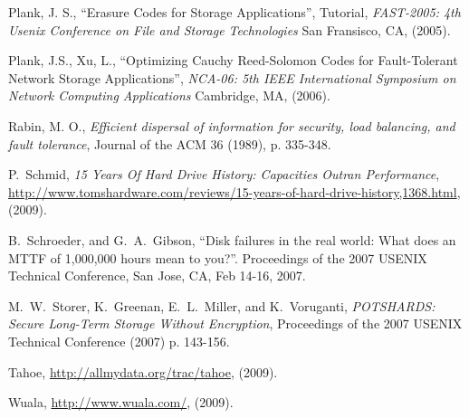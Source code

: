 \documentclass[XXX,endnotes]{usetex-v1}
\begin{document}
\begin{thebibliography}{99}
 Plank, J. S., ``Erasure Codes for Storage Applications'', Tutorial, 
\emph{FAST-2005: 4th Usenix Conference on File and Storage Technologies} San Fransisco, CA, (2005).

 Plank, J.S., Xu, L., ``Optimizing {C}auchy {R}eed-Solomon {C}odes for Fault-Tolerant Network Storage Applications'', 
\emph{NCA-06: 5th IEEE International Symposium on Network Computing Applications} Cambridge, MA, (2006).

 Rabin, M. O.,
\emph{Efficient dispersal of information for security, load balancing, and fault tolerance}, Journal of the ACM 36 (1989), p. 335-348.

 P.~Schmid, \emph{15 Years Of Hard Drive History: Capacities Outran Performance}, \url{http://www.tomshardware.com/reviews/15-years-of-hard-drive-history,1368.html}, (2009).

 B.~Schroeder, and G.~A.~Gibson, ``Disk failures in the real world: What does an MTTF of 1,000,000 hours mean to you?''. Proceedings of the 2007 USENIX Technical Conference, San Jose, CA, Feb 14-16, 2007.

 M.~W.~Storer, K.~Greenan, E.~L.~Miller, and K.~Voruganti,
\emph{POTSHARDS: Secure Long-Term Storage Without Encryption}, Proceedings of the 2007 USENIX Technical Conference (2007) p. 143-156.

 Tahoe, \url{http://allmydata.org/trac/tahoe}, (2009).

 Wuala, \url{http://www.wuala.com/}, (2009).











\end{thebibliography}
\end{document}
